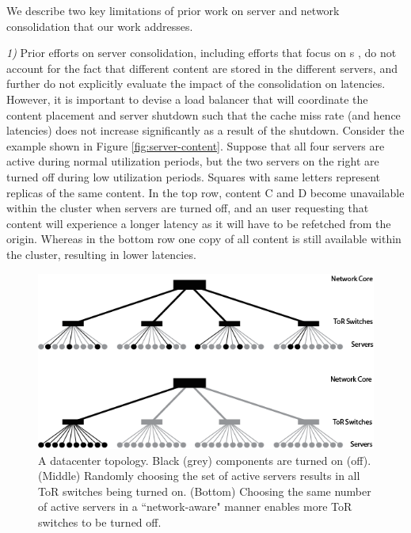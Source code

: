 {We describe two key limitations of prior work on server and network consolidation that our work addresses. 

{\em 1)} Prior efforts on server consolidation, including efforts that focus on \cdc s \cite{mathew12, mathew2014energy},  do not account for the fact that different content are stored in the different servers, and further do not explicitly evaluate the impact of the consolidation on latencies. However, it is important to devise a load balancer that will coordinate the content placement and server shutdown such that the cache miss rate (and hence latencies) does not increase significantly as a result of the shutdown. Consider the example shown in Figure \ref{fig:server-content}. Suppose that all four servers are active during normal utilization periods, but the two servers on the right are turned off during low utilization periods. Squares with same letters represent replicas of the same content. In the top row, content C and D become unavailable within the cluster when servers are turned off, and  an user requesting that content will experience a longer latency as it will have to be refetched from the origin. Whereas in the bottom row one copy of all content is still available within the cluster, resulting in lower latencies.

\begin{figure}
\centering
\includegraphics[scale=0.4]{figures/dcTopology.png}
\caption{A datacenter topology. Black (grey) components are turned on (off). 
(Middle) Randomly choosing the set of active servers results in all ToR switches being turned on.
(Bottom) Choosing the same number of active servers in a ``network-aware" manner enables more ToR switches to be turned off.}
\label{fig:server-network}
\end{figure}


}
